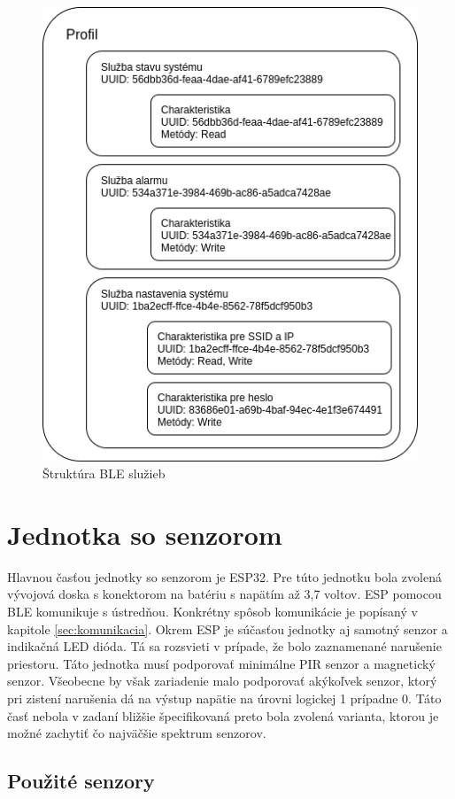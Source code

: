 \begin{figure}[ht]
    \centering
    \includegraphics[scale=0.5]{obrazky-figures/BLE_structure.png}
    \caption{Štruktúra BLE služieb}
    \label{fig:BLE_structure}
\end{figure}

\section{Jednotka so senzorom}

Hlavnou časťou jednotky so senzorom je ESP32. Pre túto jednotku bola zvolená vývojová doska s konektorom na batériu s napätím až 3,7 voltov. ESP pomocou BLE komunikuje s ústredňou. Konkrétny spôsob komunikácie je popísaný v kapitole \ref{sec:komunikacia}. Okrem ESP je súčasťou jednotky aj samotný senzor a indikačná LED dióda. Tá sa rozsvieti v prípade, že bolo zaznamenané narušenie priestoru. Táto jednotka musí podporovať minimálne PIR senzor a magnetický senzor. Všeobecne by však zariadenie malo podporovať akýkoľvek senzor, ktorý pri zistení narušenia dá na výstup napätie na úrovni logickej 1 prípadne 0. Táto časť nebola v zadaní bližšie špecifikovaná preto bola zvolená varianta, ktorou je možné zachytiť čo najväčšie spektrum senzorov.

\subsection{Použité senzory}


